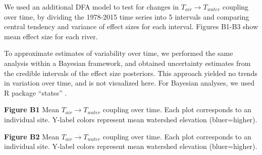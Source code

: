 \documentclass[notitlepage]{article}
\begin{document}
We used an additional DFA model to test for changes in $T_{air}\rightarrow T_{water}$ coupling over time, by dividing the 1978-2015 time series into 5 intervals and comparing central tendency and variance of effect sizes for each interval. Figures B1-B3 show mean effect size for each river.

To approximate estimates of variability over time, we performed the same analysis within a Bayesian framework, and obtained uncertainty estimates from the credible intervals of the effect size posteriors. This approach yielded no trends in variation over time, and is not visualized here. For Bayesian analyses, we used R package ``statss'' \citep{eric_ward_2017_375646}.

\begin{center}
\end{center}
\textbf{Figure B1} Mean $T_{air}\rightarrow T_{water}$ coupling over time. Each plot corresponds to an individual site. Y-label colors represent mean watershed elevation (bluer=higher).

\begin{center}
\end{center}
\textbf{Figure B2} Mean $T_{air}\rightarrow T_{water}$ coupling over time. Each plot corresponds to an individual site. Y-label colors represent mean watershed elevation (bluer=higher).
\end{document}
